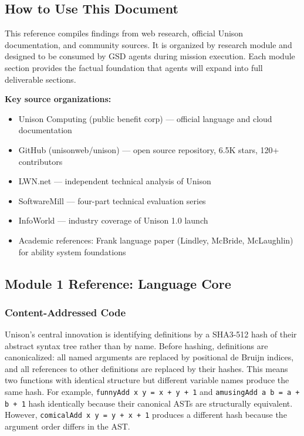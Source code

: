 \documentclass[11pt,letterpaper]{article}
\begin{document}
\subsection{How to Use This Document}

This reference compiles findings from web research, official Unison documentation, and community sources. It is organized by research module and designed to be consumed by GSD agents during mission execution. Each module section provides the factual foundation that agents will expand into full deliverable sections.

\textbf{Key source organizations:}
\begin{itemize}[leftmargin=2em]
  \item Unison Computing (public benefit corp) --- official language and cloud documentation
  \item GitHub (unisonweb/unison) --- open source repository, 6.5K stars, 120+ contributors
  \item LWN.net --- independent technical analysis of Unison
  \item SoftwareMill --- four-part technical evaluation series
  \item InfoWorld --- industry coverage of Unison 1.0 launch
  \item Academic references: Frank language paper (Lindley, McBride, McLaughlin) for ability system foundations
\end{itemize}

\subsection{Module 1 Reference: Language Core}

\subsubsection{Content-Addressed Code}

Unison's central innovation is identifying definitions by a SHA3-512 hash of their abstract syntax tree rather than by name. Before hashing, definitions are canonicalized: all named arguments are replaced by positional de Bruijn indices, and all references to other definitions are replaced by their hashes. This means two functions with identical structure but different variable names produce the same hash. For example, \texttt{funnyAdd x y = x + y + 1} and \texttt{amusingAdd a b = a + b + 1} hash identically because their canonical ASTs are structurally equivalent. However, \texttt{comicalAdd x y = y + x + 1} produces a different hash because the argument order differs in the AST.
\end{document}
